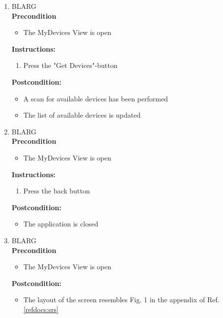 \documentclass[a4paper]{article}
\newlength{\testlabellength}
\newenvironment{testlist}{\begin{enumerate}[label=\bfseries Instruction \thesubsection.\arabic* , labelindent=0pt, labelwidth=\testlabellength , leftmargin=2cm]}{\end{enumerate}}
\newenvironment{precondition}{
{\color{white}BLARG}\\ 
\textbf{Precondition}
\begin{itemize}[labelindent=0cm, labelwidth=2cm , leftmargin=1cm]
}
{\end{itemize}}
\newenvironment{instruction}{
\textbf{Instructions:}
\begin{enumerate}[label=\bfseries  \arabic*., labelindent=0cm, labelwidth=2cm , leftmargin=1cm]
}
{\end{enumerate}}
\newenvironment{postcondition}{
\textbf{Postcondition:}
\begin{itemize}[labelindent=0cm, labelwidth=2cm , leftmargin=1cm]
}
{\end{itemize}}
\begin{document}
\begin{appendices}
\begin{testlist}
    
   
	\item
		\begin{precondition}
			\item The MyDevices View is open
		\end{precondition}
		\begin{instruction}
			\item Press the "Get Devices"-button
		\end{instruction}
		\begin{postcondition}
			\item A scan for available devices has been performed
			\item The list of available devices is updated
		\end{postcondition}
		   
   
	\item
		\begin{precondition}
			\item The MyDevices View is open
		\end{precondition}
		\begin{instruction}
			\item Press the back button
		\end{instruction}
		\begin{postcondition}
			\item The application is closed
		\end{postcondition}
		   


    \item
		\begin{precondition}
			\item The MyDevices View is open
		\end{precondition}
		\begin{postcondition}
 			\item The layout of the screen resembles Fig. 1 in the appendix of Ref. \ref{refdocs:srs}
		\end{postcondition}


\end{testlist}
\end{appendices}
\end{document}
